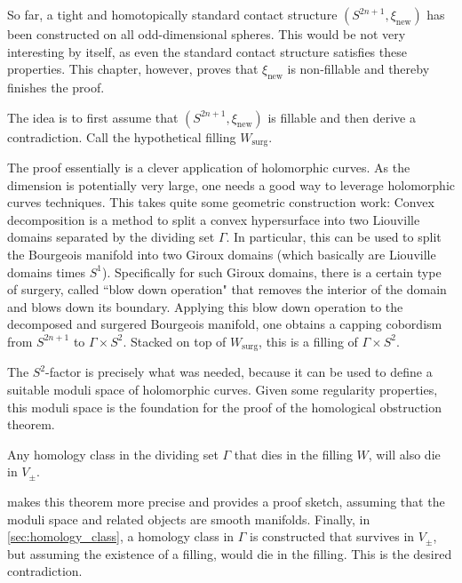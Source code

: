 So far, a tight and homotopically standard contact structure $(S^{2n+1}, \xi_\text{new})$ has been constructed on all odd-dimensional spheres.
This would be not very interesting by itself, as even the standard contact structure satisfies these properties.
This chapter, however, proves that $\xi_\text{new}$ is non-fillable and thereby finishes the proof.

The idea is to first assume that $(S^{2n+1}, \xi_\text{new})$ is fillable and then derive a contradiction.
Call the hypothetical filling $W_\text{surg}$. 

The proof essentially is a clever application of holomorphic curves.
As the dimension is potentially very large, one needs a good way to leverage holomorphic curves techniques.
This takes quite some geometric construction work: 
Convex decomposition is a method to split a convex hypersurface into two Liouville domains separated by the dividing set $\Gamma$.
In particular, this can be used to split the Bourgeois manifold into two Giroux domains (which basically are Liouville domains times $S^1$).
Specifically for such Giroux domains, there is a certain type of surgery, called ``blow down operation" that removes the
interior of the domain and blows down its boundary.
Applying this blow down operation to the decomposed and surgered Bourgeois manifold, one obtains a
capping cobordism from $S^{2n+1}$ to $\Gamma \times S^2$.
Stacked on top of $W_\text{surg}$, this is a filling of $\Gamma \times S^2$.

The $S^2$-factor is precisely what was needed, 
because it can be used to define a suitable moduli space of holomorphic curves. 
Given some regularity properties, this moduli space is the foundation for the proof of the homological obstruction theorem.
\begin{theorem}\label{th:homological_obstruction}
    Any homology class in the dividing set $\Gamma$ that dies in the filling $W$, will also die in $V_\pm$.
\end{theorem}
 makes this theorem more precise and provides a proof sketch, assuming that the moduli space and
related objects are smooth manifolds.
Finally, in \cref{sec:homology_class}, a homology class in $\Gamma$ is constructed that survives in $V_\pm$, but assuming
the existence of a filling, would die in the filling. This is the desired contradiction. 